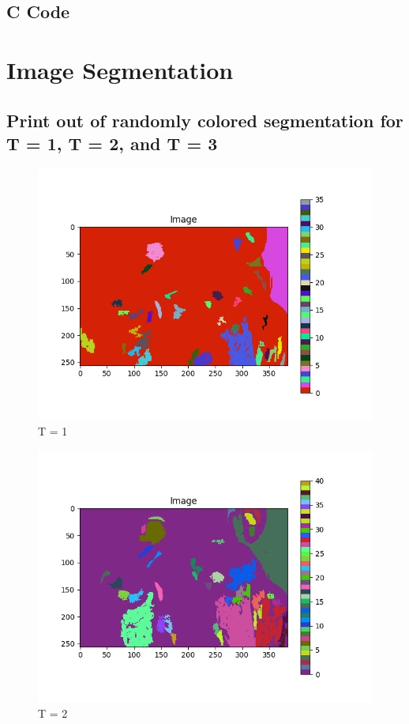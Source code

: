 \documentclass{article}
\begin{document}
\subsection{C Code}




\section{Image Segmentation}
\subsection{Print out of randomly colored segmentation for T = 1, T = 2, and T = 3}
\begin{figure}[H]
    \centering
    \includegraphics[width=1\textwidth]{../segmentation-1t-contrasted.png}
    \caption{T = 1}
    \begin{center}
    \end{center}
\end{figure}
\begin{figure}[H]
    \centering
    \includegraphics[width=1\textwidth]{../segmentation-2t-contrasted.png}
    \caption{T = 2}
    \begin{center}
    \end{center}
\end{figure}
\end{document}

